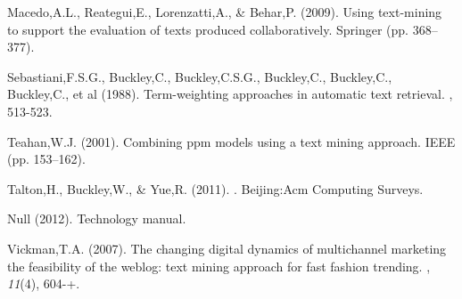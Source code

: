 \begin{thebibliography}{}
Macedo,A.L., Reategui,E., Lorenzatti,A., \& Behar,P. (2009).
\newblock Using text-mining to support the evaluation of texts produced collaboratively. Springer (pp. 368--377).

Sebastiani,F.S.G., Buckley,C., Buckley,C.S.G., Buckley,C., Buckley,C., Buckley,C., et al (1988).
\newblock Term-weighting approaches in automatic text retrieval.
, 513-523.

Teahan,W.J. (2001).
\newblock Combining ppm models using a text mining approach. IEEE (pp. 153--162).

Talton,H., Buckley,W., \& Yue,R. (2011).
. Beijing:Acm Computing Surveys.

Null (2012).
\newblock Technology manual.

Vickman,T.A. (2007).
\newblock The changing digital dynamics of multichannel marketing the feasibility of the weblog: text mining approach for fast fashion trending.
, {\em 11}(4), 604-+.

\end{thebibliography}
    
